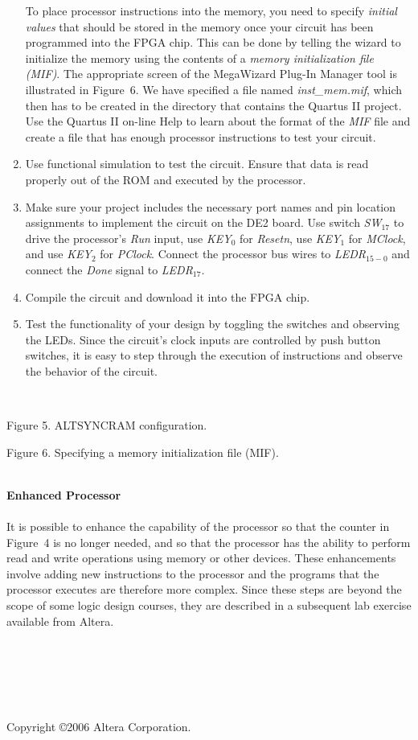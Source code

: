 \documentclass[epsfig,10pt,fullpage]{article}
\begin{document}
\begin{enumerate}
To place processor instructions into the memory, you
need to specify {\it initial values} that should be stored in the memory once your circuit
has been programmed into the FPGA chip. This can be done by telling the wizard
to initialize the memory using the contents of a {\it memory initialization file (MIF)}. The 
appropriate screen of the MegaWizard Plug-In Manager tool is illustrated in
Figure~6. We have specified a file named {\it inst\_mem.mif}, which then 
has to be created in the directory that contains the Quartus II project. Use the Quartus II 
on-line Help to learn about the format of the {\it MIF} file and create a file that has enough
processor instructions to test your circuit.
\item Use functional simulation to test the circuit. Ensure that data is read properly
out of the ROM and executed by the processor.
\item 
Make sure your project includes the necessary port names and pin location assignments 
to implement the circuit on the DE2
board. Use switch {\it SW}$_{17}$ to drive the processor's {\it Run} input, use 
{\it KEY}$_0$ for {\it Resetn}, use {\it KEY}$_1$ for {\it MClock},
and use {\it KEY}$_2$ for {\it PClock}.
Connect the processor bus wires to {\it LEDR}$_{15-0}$ and connect the {\it Done}
signal to {\it LEDR}$_{17}$.
\item Compile the circuit and download it into the FPGA chip.
\item Test the functionality of your design by toggling the switches
and observing the LEDs. Since the circuit's clock inputs are controlled by push button
switches, it is easy to step through the execution of instructions and observe the behavior
of the circuit.
\end{enumerate}
~\\
\begin{figure}[H]
\scriptsize
\centerline{
\hbox{}}
\end{figure}
\centerline{Figure 5. ALTSYNCRAM configuration.}
\begin{figure}[H]
\scriptsize
\centerline{
\hbox{}}
\end{figure}
\centerline{Figure 6. Specifying a memory initialization file (MIF).}

~\\
\noindent
{\bf Enhanced Processor}
~\\
~\\
\noindent
It is possible to enhance the capability of the processor so that the counter in 
Figure~4 is no longer needed, and so that the processor has the ability to perform read and
write operations using memory or other devices. These enhancements involve adding new
instructions to the processor and the programs that the processor executes are therefore
more complex. Since these steps are beyond the scope of some logic design courses, they
are described in a subsequent lab exercise available from Altera.

~\\
~\\
~\\
~\\
~\\
Copyright \copyright 2006 Altera Corporation.
\end{document}
